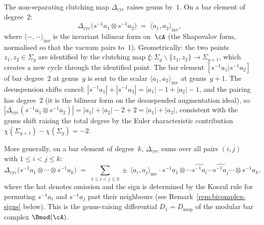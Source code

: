 \begin{construction}
\label{constr:nonsep-clutching}
The non-separating clutching map $\Delta_{\mathrm{cyc}}$ raises
genus by~$1$. On a bar element of degree~$2$:
\begin{equation}\label{eq:nonsep-clutching-explicit}
 \Delta_{\mathrm{cyc}}\bigl(
 s^{-1}a_1 \otimes s^{-1}a_2\bigr)
 \;=\;
 \langle a_1, a_2 \rangle_{\mathrm{inv}},
\end{equation}
where $\langle{-},{-}\rangle_{\mathrm{inv}}$ is the invariant bilinear
form on~$\cA$ (the Shapovalov form, normalised so that the vacuum
pairs to~$1$). Geometrically: the two points $z_1, z_2 \in \Sigma_g$
are identified by the clutching map
$\xi\colon \Sigma_g \smallsetminus \{z_1, z_2\} \to \Sigma_{g+1}$,
which creates a new cycle through the identified point. The bar
element $[s^{-1}a_1 | s^{-1}a_2]$ of bar degree~$2$ at genus~$g$
is sent to the scalar $\langle a_1, a_2\rangle_{\mathrm{inv}}$ at
genus~$g+1$. The desuspension shifts cancel:
$|s^{-1}a_1| + |s^{-1}a_2| = |a_1| - 1 + |a_2| - 1$, and the
pairing has degree~$2$ (it is the bilinear form on the desuspended
augmentation ideal), so
$|\Delta_{\mathrm{cyc}}(s^{-1}a_1 \otimes s^{-1}a_2)| =
|a_1| + |a_2| - 2 + 2 = |a_1| + |a_2|$, consistent with the
genus shift raising the total degree by the Euler characteristic
contribution $\chi(\Sigma_{g+1}) - \chi(\Sigma_g) = -2$.

More generally, on a bar element of degree~$k$,
$\Delta_{\mathrm{cyc}}$ sums over all pairs $(i,j)$ with
$1 \leq i < j \leq k$:
\begin{equation}\label{eq:nonsep-clutching-general}
 \Delta_{\mathrm{cyc}}\bigl(
 s^{-1}a_1 \otimes \cdots \otimes s^{-1}a_k\bigr)
 \;=\;
 \sum_{1 \leq i < j \leq k}
 \pm\,
 \langle a_i, a_j \rangle_{\mathrm{inv}}
 \cdot
 s^{-1}a_1 \otimes \cdots
 \widehat{s^{-1}a_i} \cdots
 \widehat{s^{-1}a_j} \cdots
 \otimes s^{-1}a_k,
\end{equation}
where the hat denotes omission and the sign is determined by the
Koszul rule for permuting $s^{-1}a_i$ and $s^{-1}a_j$ past their
neighbours (see Remark~\ref{rem:bicomplex-signs} below). This is the
genus-raising differential $D_1 = D_{\mathrm{nsep}}$ of the modular
bar complex $\Bmod(\cA)$.
\end{construction}

